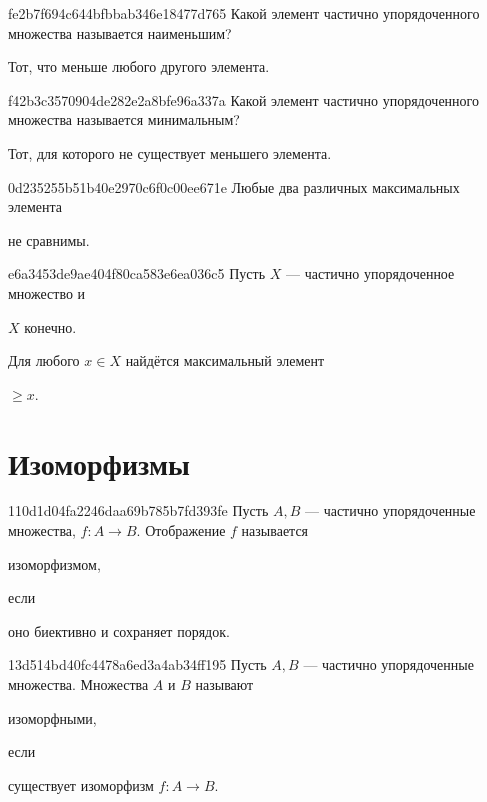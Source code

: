 \begin{note}{fe2b7f694c644bfbbab346e18477d765}
    Какой элемент частично упорядоченного множества называется наименьшим?

    \begin{cloze}{1}
        Тот, что меньше любого другого элемента.
    \end{cloze}
\end{note}

\begin{note}{f42b3c3570904de282e2a8bfe96a337a}
    Какой элемент частично упорядоченного множества называется минимальным?

    \begin{cloze}{1}
        Тот, для которого не существует меньшего элемента.
    \end{cloze}
\end{note}

\begin{note}{0d235255b51b40e2970c6f0c00ee671e}
    Любые два различных максимальных элемента \begin{icloze}{1}не сравнимы.\end{icloze}
\end{note}

\begin{note}{e6a3453de9ae404f80ca583e6ea036c5}
    Пусть \({ X }\) --- частично упорядоченное множество и \begin{icloze}{2}\({ X }\) конечно.\end{icloze}
    Для любого \({ x \in X }\) найдётся максимальный элемент \begin{icloze}{1}\({ \geqslant x }\).\end{icloze}
\end{note}

\section{Изоморфизмы}
\begin{note}{110d1d04fa2246daa69b785b7fd393fe}
    Пусть \({ A, B }\) --- частично упорядоченные множества, \({ f : A \to B }\).
    Отображение \({ f }\) называется \begin{icloze}{2}изоморфизмом,\end{icloze} если \begin{icloze}{1}оно биективно и сохраняет порядок.\end{icloze}
\end{note}

\begin{note}{13d514bd40fc4478a6ed3a4ab34ff195}
    Пусть \({ A, B }\) --- частично упорядоченные множества.
    Множества \({ A }\) и \({ B }\) называют \begin{icloze}{2}изоморфными,\end{icloze} если \begin{icloze}{1}существует изоморфизм \({ f : A \to B }\).\end{icloze}
\end{note}

